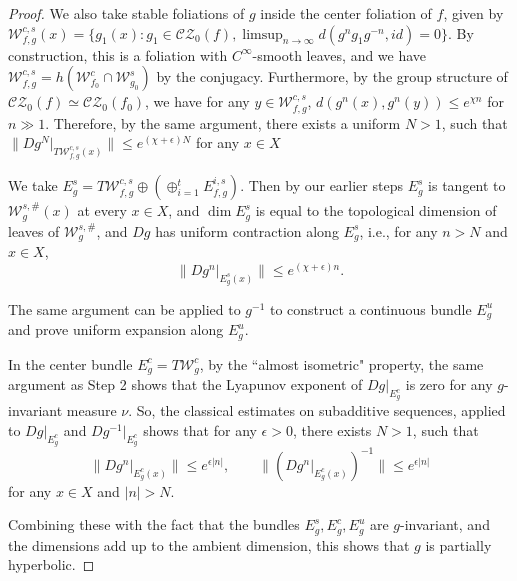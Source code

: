 \documentclass[11pt]{amsart}
\numberwithin{equation}{section}
\newcommand{\W}{\mathcal{W}}
\newcommand{\CZ}{\mathcal{CZ}}
\theoremstyle{plain}
\begin{document}
\begin{proof}
We also take stable foliations of $g$ inside the center foliation of $f$, given by $\W^{c,s}_{f,g}(x)=\{g_1(x): g_1\in \CZ_0(f), \limsup_{n\to \infty }d(g^ng_1g^{-n},id)=0\}$. By construction, this is a foliation with $C^\infty$-smooth leaves, and we have $\W^{c,s}_{f,g}=h(\W^c_{f_0}\cap \W^s_{g_0})$ by the conjugacy. Furthermore, by the group structure of $\CZ_0(f)\simeq \CZ_0(f_0)$, we have for any $y\in \W^{c,s}_{f,g}$, $d(g^n(x),g^n(y))\le e^{\chi n}$ for $n\gg 1$. Therefore, by the same argument, there exists a uniform $N>1$, such that $\|Dg^N|_{T\W^{c,s}_{f,g}(x)}\|\le e^{(\chi+\epsilon)N}$  for any $x\in X$

We take $E^s_g=T\W^{c,s}_{f,g}\oplus(\oplus_{i=1}^t E^{i,s}_{f,g})$. Then by our earlier steps $E^s_g$ is tangent to $\W^{s,\#}_g(x)$ at every $x\in X$, and $\dim E^s_g$ is equal to the topological dimension of leaves of $\W^{s,\#}_g$, and $Dg$ has uniform contraction along $E^s_g$, i.e., for any $n>N$ and $x\in X$, $$\|Dg^n|_{E^s_g(x)}\|\le e^{(\chi+\epsilon)n}.$$

The same argument can be applied to $g^{-1}$ to construct a continuous bundle $E^u_g$ and prove uniform expansion along $E^u_g$. 

In the center bundle $E^c_g=T\W^c_g$, by the ``almost isometric" property, the same argument as Step 2 shows that the Lyapunov exponent of $Dg|_{E^c_g}$ is zero for any $g$-invariant measure $\nu$. So, the classical estimates on subadditive sequences, applied to $Dg|_{E^c_g}$ and $Dg^{-1}|_{E^c_g}$ shows that for any $\epsilon>0$, there exists $N>1$, such that \[
\|Dg^n|_{E^c_g(x)}\|\le e^{\epsilon |n|},
\qquad
\|(Dg^n|_{E^c_g(x)})^{-1}\|\le e^{\epsilon |n|}
\] for any $x\in X$ and $|n|>N$.

Combining these with the fact that the bundles $E^s_g,E^c_g, E^u_g$ are $g$-invariant, and the dimensions add up to the ambient dimension, this shows that $g$ is partially hyperbolic.
\end{proof}




{}

\end{document}
